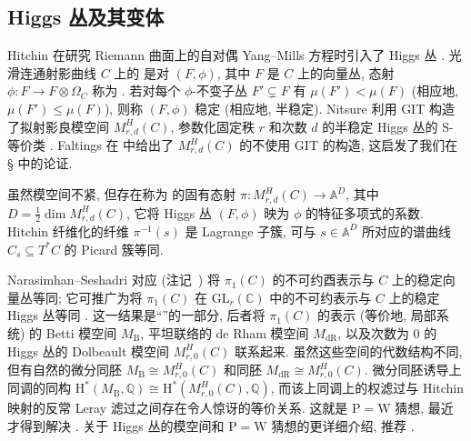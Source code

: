 \subsection{Higgs 丛及其变体}\label{src:10.2.2-subsection}
Hitchin 在研究 Riemann 曲面上的自对偶 Yang--Mills 方程时引入了 Higgs 丛 \cite{Hit87}. 光滑连通射影曲线 $C$ 上的 是对 $(F,\phi)$, 其中 $F$ 是 $C$ 上的向量丛, 态射 $\phi:F\to F\otimes\Omega_C$ 称为 . 若对每个 $\phi$-不变子丛 $F'\subsetneq F$ 有 $\mu(F')<\mu(F)$ (相应地, $\mu(F')\leq\mu(F)$), 则称 $(F,\phi)$ 稳定 (相应地, 半稳定). Nitsure 利用 GIT 构造了拟射影良模空间 $M_{r,d}^{H}(C)$, 参数化固定秩 $r$ 和次数 $d$ 的半稳定 Higgs 丛的 S-等价类 \cite{Nit91}. Faltings 在 \cite{Fal93} 中给出了 $M_{r,d}^{H}(C)$ 的不使用 GIT 的构造, 这启发了我们在 \S{} 中的论证.

虽然模空间不紧, 但存在称为 的固有态射 $\pi:M_{r,d}^{H}(C)\to\mathbb A^D$, 其中 $D=\frac12\dim M_{r,d}^{H}(C)$, 它将 Higgs 丛 $(F,\phi)$ 映为 $\phi$ 的特征多项式的系数. Hitchin 纤维化的纤维 $\pi^{-1}(s)$ 是 Lagrange 子簇, 可与 $s\in\mathbb A^D$ 所对应的谱曲线 $C_s\subseteq T^*C$ 的 Picard 簇等同.

Narasimhan--Seshadri 对应 (注记~) 将 $\pi_1(C)$ 的不可约酉表示与 $C$ 上的稳定向量丛等同; 它可推广为将 $\pi_1(C)$ 在 $\mathrm{GL}_r(\mathbb C)$ 中的不可约表示与 $C$ 上的稳定 Higgs 丛等同 \cite{Sim92}. 这一结果是``''的一部分, 后者将 $\pi_1(C)$ 的表示 (等价地, 局部系统) 的 Betti 模空间 $M_{\mathrm B}$, 平坦联络的 de Rham 模空间 $M_{\mathrm{dR}}$, 以及次数为 $0$ 的 Higgs 丛的 Dolbeault 模空间 $M_{r,0}^{H}(C)$ 联系起来. 虽然这些空间的代数结构不同, 但有自然的微分同胚 $M_{\mathrm B}\cong M_{r,0}^{H}(C)$ 和同胚 $M_{\mathrm{dR}}\cong M_{r,0}^{H}(C)$. 微分同胚诱导上同调的同构 $\mathrm H^*(M_{\mathrm B},\mathbb Q)\cong\mathrm H^*(M_{r,0}^{H}(C),\mathbb Q)$, 而该上同调上的权滤过与 Hitchin 映射的反常 Leray 滤过之间存在令人惊讶的等价关系. 这就是 $\mathrm P=\mathrm W$ 猜想, 最近才得到解决 \cite{HMMS25,MS24}. 关于 Higgs 丛的模空间和 $\mathrm P=\mathrm W$ 猜想的更详细介绍, 推荐 \cite{Hei24,Hos24}.

